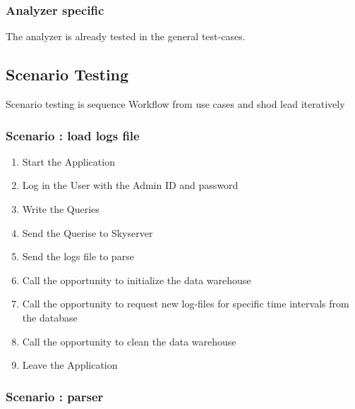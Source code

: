 \subsubsection{Analyzer specific}

The analyzer is already tested in the general test-cases.



\subsection{Scenario Testing}

Scenario testing is sequence Workflow from use cases and shod lead iteratively

\renewcommand{\theenumi}{/T\arabic{enumi}0/}
\renewcommand{\labelenumi}{\theenumi}

\subsubsection {Scenario : load logs file} 

\begin{enumerate}
 
\item Start the Application

\item Log in the User with the Admin ID and password

\item Write the Queries

\item Send the Querise to Skyserver

\item Send the logs file to parse

\item Call the opportunity to initialize the data warehouse

\item Call the opportunity to request new log-files for specific time intervals from the
database

\item Call the opportunity to clean the data warehouse %

\item Leave the Application

\end{enumerate} 

\subsubsection {Scenario : parser} 

